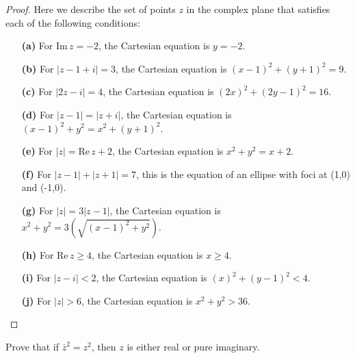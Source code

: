 \begin{proof}
    Here we describe the set of points \( z \) in the complex plane that satisfies each of the following conditions:
    
    \begin{enumerate}
      \item[\textbf{(a)}] For \( \text{Im} \, z = -2 \), the Cartesian equation is \( y = -2 \).
      \item[\textbf{(b)}] For \( |z - 1 + i| = 3 \), the Cartesian equation is \( (x - 1)^2 + (y + 1)^2 = 9 \).
      \item[\textbf{(c)}] For \( |2z - i| = 4 \), the Cartesian equation is \( (2x)^2 + (2y - 1)^2 = 16 \).
      \item[\textbf{(d)}] For \( |z - 1| = |z + i| \), the Cartesian equation is \( (x - 1)^2 + y^2 = x^2 + (y + 1)^2 \).
      \item[\textbf{(e)}] For \( |z| = \text{Re} \, z + 2 \), the Cartesian equation is \( x^2 + y^2 = x + 2 \).
      \item[\textbf{(f)}] For \( |z - 1| + |z + 1| = 7 \), this is the equation of an ellipse with foci at (1,0) and (-1,0).
      \item[\textbf{(g)}] For \( |z| = 3|z - 1| \), the Cartesian equation is \( x^2 + y^2 = 3(\sqrt{(x - 1)^2 + y^2}) \).
      \item[\textbf{(h)}] For \( \text{Re} \, z \geq 4 \), the Cartesian equation is \( x \geq 4 \).
      \item[\textbf{(i)}] For \( |z - i| < 2 \), the Cartesian equation is \( (x)^2 + (y - 1)^2 < 4 \).
      \item[\textbf{(j)}] For \( |z| > 6 \), the Cartesian equation is \( x^2 + y^2 > 36 \).
    \end{enumerate}
    \end{proof}

    \begin{exercise}
        Prove that if \( \overline{z}^2 = z^2 \), then \( z \) is either real or pure imaginary.
        \end{exercise}
        
